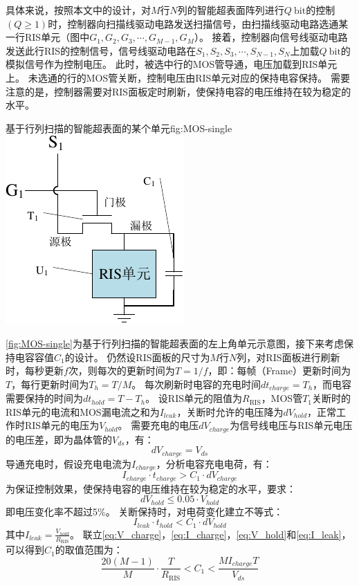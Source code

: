 \documentclass[supercite]{HustGraduPaper}
\begin{document}
具体来说，按照本文中的设计，对$M$行$N$列的智能超表面阵列进行$Q ~ \mathrm{bit}$的控制$(Q \ge 1)$时，控制器向扫描线驱动电路发送扫描信号，由扫描线驱动电路选通某一行RIS单元（图中$G_1,G_2,G_3,\cdots,G_{M-1},G_M$）。
接着，控制器向信号线驱动电路发送此行RIS的控制信号，信号线驱动电路在$S_1,S_2,S_3,\cdots,S_{N-1},S_N$上加载$Q ~ \mathrm{bit}$的模拟信号作为控制电压。
此时，被选中行的MOS管导通，电压加载到RIS单元上。
未选通的行的MOS管关断，控制电压由RIS单元对应的保持电容保持。
需要注意的是，控制器需要对RIS面板定时刷新，使保持电容的电压维持在较为稳定的水平。

\begin{generalfig}[htb]{基于行列扫描的智能超表面的某个单元}{fig:MOS-single}
	\includegraphics[width=0.4\linewidth]{Figures/MOS-single.pdf}
\end{generalfig}

\autoref{fig:MOS-single}为基于行列扫描的智能超表面的左上角单元示意图，接下来考虑保持电容容值$C_1$的设计。
仍然设RIS面板的尺寸为$M$行$N$列，对RIS面板进行刷新时，每秒更新$f$次，则每次的更新时间为$T=1/f$，即：每帧（Frame）更新时间为$T$，每行更新时间为$T_h=T/M$。
每次刷新时电容的充电时间$dt_{charge}=T_h$，而电容需要保持的时间为$dt_{hold}=T-T_h$。
设RIS单元的阻值为$R_\mathrm{RIS}$，MOS管$T_1$关断时的RIS单元的电流和MOS漏电流之和为$I_{leak}$，关断时允许的电压降为$dV_{hold}$，正常工作时RIS单元的电压为$V_{hold}$。
需要充电的电压$dV_{charge}$为信号线电压与RIS单元电压的电压差，即为晶体管的$V_{ds}$，有：
\begin{equation}
	dV_{charge} = V_{ds}
	\label{eq:V_charge}
\end{equation}
导通充电时，假设充电电流为$I_{charge}$，分析电容充电电荷，有：
\begin{equation}
	I_{charge} \cdot t_{charge}>C_1 \cdot dV_{charge}
	\label{eq:I_charge}
\end{equation}
为保证控制效果，使保持电容的电压维持在较为稳定的水平，要求：
\begin{equation}
	dV_{hold} \le 0.05 \cdot V_{hold}
	\label{eq:V_hold}
\end{equation}
即电压变化率不超过5\%。
关断保持时，对电荷变化建立不等式：
\begin{equation}
	I_{leak} \cdot t_{hold} < C_1 \cdot dV_{hold}
	\label{eq:I_leak}
\end{equation}
其中$I_{leak} = \frac{V_{hold}}{R_\mathrm{RIS}}$。
联立\autoref{eq:V_charge}，\autoref{eq:I_charge}，\autoref{eq:V_hold}和\autoref{eq:I_leak}，可以得到$C_1$的取值范围为：
\begin{equation}
	\frac{20(M-1)}{M} \cdot \frac{T}{R_\mathrm{RIS}} < C_1 < \frac{MI_{charge}T}{V_{ds}}
	\label{eq:C1_value}
\end{equation}
\end{document}
